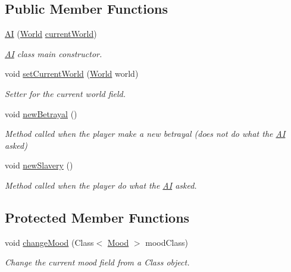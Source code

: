 \subsection*{Public Member Functions}
\begin{DoxyCompactItemize}
\item 
\hyperlink{a00001_afbee4fe418889d96a38c9874a36e901d}{A\-I} (\hyperlink{a00039}{World} \hyperlink{a00001_ae4344290e04c468cdd631fc367f4f885}{current\-World})
\begin{DoxyCompactList}\small\item\em \hyperlink{a00001}{A\-I} class main constructor. \end{DoxyCompactList}\item 
void \hyperlink{a00001_a0e329d9bc649c02f73422c285e9e4e15}{set\-Current\-World} (\hyperlink{a00039}{World} world)
\begin{DoxyCompactList}\small\item\em Setter for the current world field. \end{DoxyCompactList}\item 
void \hyperlink{a00001_ade34cf6dd9b6f1c6ebceccf040fffeb4}{new\-Betrayal} ()
\begin{DoxyCompactList}\small\item\em Method called when the player make a new betrayal (does not do what the \hyperlink{a00001}{A\-I} asked) \end{DoxyCompactList}\item 
void \hyperlink{a00001_ae37c568fcf8ccf9596665b94cb9c4702}{new\-Slavery} ()
\begin{DoxyCompactList}\small\item\em Method called when the player do what the \hyperlink{a00001}{A\-I} asked. \end{DoxyCompactList}\end{DoxyCompactItemize}
\subsection*{Protected Member Functions}
\begin{DoxyCompactItemize}
\item 
void \hyperlink{a00001_adbb46250627224cb4cd42ad99eaf42ba}{change\-Mood} (Class$<$ \hyperlink{a00015}{Mood} $>$ mood\-Class)
\begin{DoxyCompactList}\small\item\em Change the current mood field from a Class object. \end{DoxyCompactList}\end{DoxyCompactItemize}
